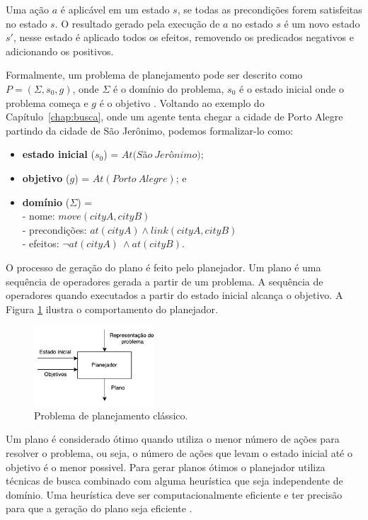 Uma ação $a$ é aplicável em um estado $s$, se todas as precondições forem satisfeitas no estado $s$. O resultado gerado pela execução de $a$ no estado $s$ é um novo estado $s'$, nesse estado é aplicado todos os efeitos, removendo os predicados negativos e adicionando os positivos.

Formalmente, um problema de planejamento pode ser descrito como $P = (\Sigma, s_{0}, g)$, onde $\Sigma$ é o domínio do problema, $s_{0}$ é o estado inicial onde o problema começa e $g$ é o objetivo \cite{ghallab2004automated}. Voltando ao exemplo do Capítulo~\ref{chap:busca}, onde um agente tenta chegar a cidade de Porto Alegre partindo da cidade de São Jerônimo, podemos formalizar-lo como:

\begin{itemize}
	\item \textbf{estado inicial} ($s_{0}$) = $At(S$\~a$o~Jer$\^o$nimo)$;
	\item \textbf{objetivo} ($g$) = $At(Porto~Alegre)$; e
	\item \textbf{domínio} ($\Sigma$) = \\
	-	nome: $move(cityA, cityB)$\\
	-	precondições: $at(cityA) \wedge link(cityA, cityB)$\\
	-	efeitos: $\neg at(cityA)~ \wedge at(cityB)$.
\end{itemize}

O processo de geração do plano é feito pelo planejador. Um plano é uma sequência de operadores gerada a partir de um problema. A sequência de operadores quando executados a partir do estado inicial alcança o objetivo. A Figura \ref{fig:planmodelo} ilustra o comportamento do planejador.

\begin{figure}[ht]
	\centering
	\includegraphics[width=0.4\textwidth]{fig/modelo.pdf}
	\caption{Problema de planejamento clássico.}
	\label{fig:planmodelo}
\end{figure} 

Um plano é considerado ótimo quando utiliza o menor número de ações para resolver o problema, ou seja, o número de ações que levam o estado inicial até o objetivo é o menor possivel. Para gerar planos ótimos o planejador utiliza técnicas de busca combinado com alguma heurística que seja independente de domínio. Uma heurística deve ser computacionalmente eficiente e ter precisão para que a geração do plano seja eficiente \cite{helmert2007flexible}. %

